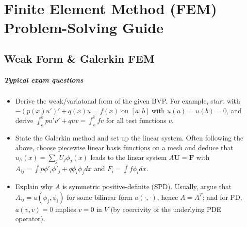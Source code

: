 \documentclass[a4paper,11pt]{report}
\begin{document}
\chapter{Finite Element Method (FEM) Problem-Solving Guide}

\section{Weak Form \& Galerkin FEM}
\paragraph{Typical exam questions}
\begin{itemize}
    \item Derive the weak/variatonal form of the given BVP. For example, start with $- (p(x)u')' + q(x)u = f(x)$ on $[a,b]$ with $u(a)=u(b)=0$, and derive $\int_a^b pu'v' + quv = \int_a^b fv$ for all test functions $v$.
    \item State the Galerkin method and set up the linear system. Often following the above, choose piecewise linear basis functions on a mesh and deduce that $u_h(x)=\sum_j U_j \phi_j(x)$ leads to the linear system $A\mathbf{U}=\mathbf{F}$ with $A_{ij}=\int p\phi'_i\phi'_j + q\phi_i\phi_jdx$ and $F_i=\int f\phi_idx$.
    \item Explain why $A$ is symmetric positive-definite (SPD). Usually, argue that $A_{ij} = a(\phi_j,\phi_i)$ for some bilinear form $a(\cdot,\cdot)$, hence $A=A^T$; and for PD, $a(v,v)=0$ implies $v=0$ in $V$ (by coercivity of the underlying PDE operator).
\end{itemize}
\end{document}
